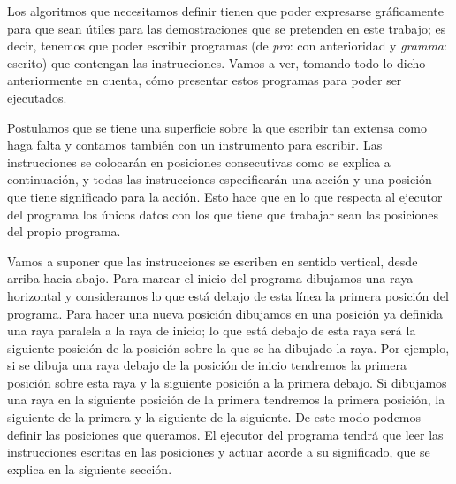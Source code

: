 %
Los algoritmos que necesitamos definir tienen que poder expresarse gráficamen\-te para que sean útiles
para las demostraciones que se pretenden en este trabajo; es decir, tenemos que poder escribir
programas (de {\it pro}: con anterioridad y {\it gramma}: escrito) que contengan las
instrucciones. Vamos a ver, tomando todo lo dicho anteriormente en cuenta, cómo presentar estos
programas para poder ser ejecutados.

Postulamos que se tiene una superficie sobre la que escribir tan extensa como haga falta y contamos
también con un instrumento para escribir. Las instrucciones se colocarán en posiciones consecutivas
como se explica a continuación, y todas las instrucciones especificarán una acción y una posición
que tiene significado para la acción. Esto hace que en lo que respecta al ejecutor del programa los
únicos datos con los que tiene que trabajar sean las posiciones del propio programa.

Vamos a suponer que las instrucciones se escriben en sentido vertical, desde arriba hacia
abajo. Para marcar el inicio del programa dibujamos una raya ho\-ri\-zontal y consideramos lo que está
debajo de esta línea la primera posición del programa. Para hacer una nueva posición dibujamos en
una posición ya definida una raya paralela a la raya de inicio; lo que está debajo de esta raya será
la siguiente posición de la posición sobre la que se ha dibujado la raya. Por ejemplo, si se dibuja
una raya debajo de la posición de inicio tendremos la primera posición sobre esta raya y la
siguiente posición a la primera debajo. Si dibujamos una raya en la siguiente posición de la primera
tendremos la primera posición, la siguiente de la primera y la siguiente de la siguiente. De este
modo podemos definir las posiciones que queramos. El ejecutor del programa tendrá que leer las
instrucciones escritas en las posiciones y actuar acorde a su significado, que se explica en la
siguiente sección.
